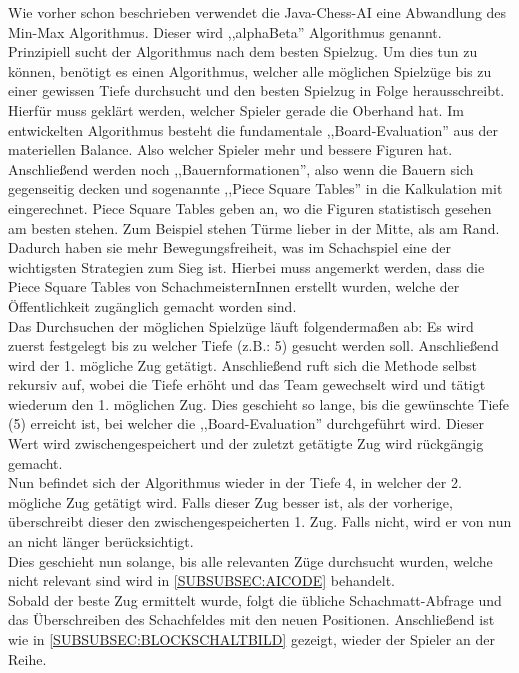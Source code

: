 \documentclass[12pt,a4paper]{article}
\begin{document}
{Wie vorher schon beschrieben verwendet die Java-Chess-AI eine Abwandlung des Min-Max Algorithmus. Dieser wird ,,alphaBeta'' Algorithmus genannt. \\
Prinzipiell sucht der Algorithmus nach dem besten Spielzug. Um dies tun zu können, benötigt es einen Algorithmus, welcher alle möglichen Spielzüge bis zu einer gewissen Tiefe durchsucht und den besten Spielzug in Folge herausschreibt. \\ 
Hierfür muss geklärt werden, welcher Spieler gerade die Oberhand hat. Im entwickelten Algorithmus besteht die fundamentale ,,Board-Evaluation'' aus der materiellen Balance. Also welcher Spieler mehr und bessere Figuren hat. Anschließend werden noch  ,,Bauernformationen'', also wenn die Bauern sich gegenseitig decken und sogenannte ,,Piece Square Tables'' in die Kalkulation mit eingerechnet. Piece Square Tables geben an, wo die Figuren statistisch gesehen am besten stehen. Zum Beispiel stehen Türme lieber in der Mitte, als am Rand. Dadurch haben sie mehr Bewegungsfreiheit, was im Schachspiel eine der wichtigsten Strategien zum Sieg ist. Hierbei muss angemerkt werden, dass die Piece Square Tables von SchachmeisternInnen erstellt wurden, welche der Öffentlichkeit zugänglich gemacht worden sind.\cite{SquareTables} \\[2ex]
Das Durchsuchen der möglichen Spielzüge läuft folgendermaßen ab: Es wird zuerst festgelegt bis zu welcher Tiefe (z.B.: 5) gesucht werden soll. Anschließend wird der 1. mögliche Zug getätigt. Anschließend ruft sich die Methode selbst rekursiv auf, wobei die Tiefe erhöht und das Team gewechselt wird und tätigt wiederum den 1. möglichen Zug. Dies geschieht so lange, bis die gewünschte Tiefe (5) erreicht ist, bei welcher die ,,Board-Evaluation'' durchgeführt wird. Dieser Wert wird zwischengespeichert und der zuletzt getätigte Zug wird rückgängig gemacht. \\
Nun befindet sich der Algorithmus wieder in der Tiefe 4, in welcher der 2. mögliche Zug getätigt wird. Falls dieser Zug besser ist, als der vorherige, überschreibt dieser den zwischengespeicherten 1. Zug. Falls nicht, wird er von nun an nicht länger berücksichtigt. \\
Dies geschieht nun solange, bis alle relevanten Züge durchsucht wurden, welche nicht relevant sind wird in \ref{SUBSUBSEC:AICODE} behandelt. \\
Sobald der beste Zug ermittelt wurde, folgt die übliche Schachmatt-Abfrage und das Überschreiben des Schachfeldes mit den neuen Positionen. Anschließend ist wie in \ref{SUBSUBSEC:BLOCKSCHALTBILD} gezeigt, wieder der Spieler an der Reihe. \\[2ex]
}
\end{document}
